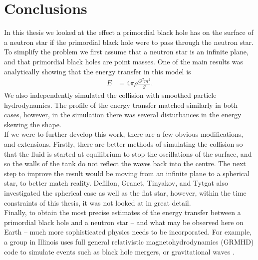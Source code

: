 \chapter{Conclusions}
\label{chap:conc}

In this thesis we looked at the effect a primordial black hole has on the surface of a neutron star if the primordial black hole were to pass through the neutron star. To simplify the problem we first assume that a neutron star is an infinite plane, and that primordial black holes are point masses. One of the main results was analytically showing that the energy transfer in this model is
\begin{align*}
E &= 4 \pi \rho \frac{G^2 m^2}{g}.
\end{align*}
We also independently simulated the collision with smoothed particle hydrodynamics. The profile of the energy transfer matched similarly in both cases, however, in the simulation there was several disturbances in the energy skewing the shape. \\

If we were to further develop this work, there are a few obvious modifications, and extensions. Firstly, there are better methods of simulating the collision so that the fluid is started at equilibrium to stop the oscillations of the surface, and so the walls of the tank do not reflect the waves back into the centre. The next step to improve the result would be moving from an infinite plane to a spherical star, to better match reality. Defillon, Granet, Tinyakov, and Tytgat \cite{tidalcapture} also investigated the spherical case as well as the flat star, however, within the time constraints of this thesis, it was not looked at in great detail. \\

Finally, to obtain the most precise estimates of the energy transfer between a primordial black hole and a neutron star -- and what may be observed here on Earth -- much more sophisticated physics needs to be incorporated. For example, a group in Illinois uses full general relativistic magnetohydrodynamics (GRMHD) code to simulate events such as black hole mergers, or gravitational waves \cite{nuts}.